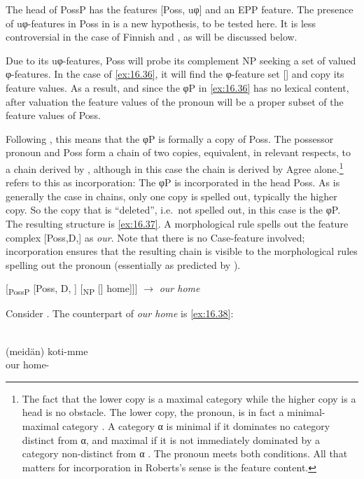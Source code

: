 \documentclass[output=paper]{langsci/langscibook}
\begin{document}
The head of PossP has the features [Poss, uφ] and an \gls{EPP} feature. The presence of uφ-features in Poss in 
is a new hypothesis, to be tested here. It is less controversial in the case of
Finnish and , as will be discussed below.

Due to its uφ-features, Poss will probe its complement NP seeking a set of
valued φ-features. In the case of \eqref{ex:16.36}, it will find the φ-feature set [\Fpl{}]
and copy its feature values. As a result, and since the φP in \eqref{ex:16.36} has no
lexical content, after valuation the feature values of the pronoun will be a
proper subset of the feature values of Poss.

Following \textcite{Roberts2010,Roberts2010b}, this means that the φP is formally a copy of Poss.
The possessor pronoun and Poss form a chain of two copies, equivalent, in
relevant respects, to a chain derived by , although in this case the
chain is derived by Agree alone.\footnote{The fact that the lower copy is a
    maximal category while the higher copy is a head is no obstacle. The lower
    copy, the pronoun, is in fact a minimal-maximal category
    \citep[249]{Chomsky1995}. A category α is minimal if it dominates no
    category distinct from α, and maximal if it is not immediately
    dominated by a category non-distinct from α
    \citep[54--56]{Roberts2010}. The pronoun meets both conditions. All that
matters for incorporation in Roberts’s sense is the feature
content.\label{fn:16.19}} \textcite{Roberts2010,Roberts2010b} refers to this as incorporation: The φP is incorporated in the head
Poss. As is generally the case in chains, only one copy is spelled out,
typically the higher copy. So the copy that is \enquote{deleted}, i.e.\  not
spelled out, in this case is the φP. The resulting structure is
\eqref{ex:16.37}. A morphological rule spells out the feature complex
[Poss,D,\Fpl{}] as \emph{our}. Note that there is no Case-feature involved;
incorporation ensures that the resulting chain is visible to the morphological
rules spelling out the pronoun (essentially as predicted by
\citealt[117--119]{Baker1988}).

\ea\label{ex:16.37}
    {}[\textsubscript{PossP} [Poss, D, \Fpl{}] [\textsubscript{NP} [\sout{\Fpl}]
        home]]] $\rightarrow$ \emph{our home}
\z

Consider . The counterpart of \emph{our home} is \eqref{ex:16.38}:

\ea\label{ex:16.38} \\
    \gll (meidän) koti-mme\\
        \hphantom{(}our home-\Fpl{}\\
\z
\end{document}
